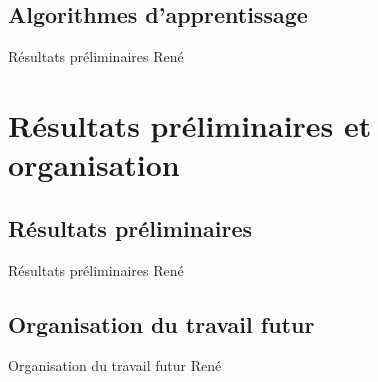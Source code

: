 \documentclass{beamer}
\begin{document}
\subsection[Algorithmes d'apprentissage]{Algorithmes d'apprentissage}

\begin{frame}{Résultats préliminaires}
René

\end{frame}

\section[Résultats]{Résultats préliminaires et organisation}

\subsection[Résultats préliminaires]{Résultats préliminaires}

\begin{frame}{Résultats préliminaires}
René

\end{frame}

\subsection[Organisation]{Organisation du travail futur}

\begin{frame}{Organisation du travail futur}
René

\end{frame}
\end{document}
